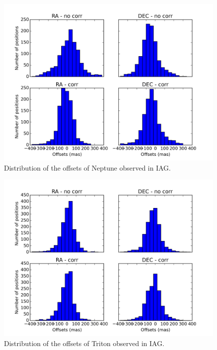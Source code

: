 \documentclass[12pt,a4paper]{report}
\begin{document}
\begin{figure}[h]
\includegraphics[width=17.0cm]{dist_Netuno_IAG.png} 
\caption{Distribution of the offsets of Neptune observed in IAG.}
\label{Fig:refraction-net-iag}
\end{figure}
\begin{figure}[h]
\includegraphics[width=17.0cm]{dist_Triton_IAG.png} 
\caption{Distribution of the offsets of Triton observed in IAG.}
\label{Fig:refraction-tri-iag}
\end{figure}
\end{document}

